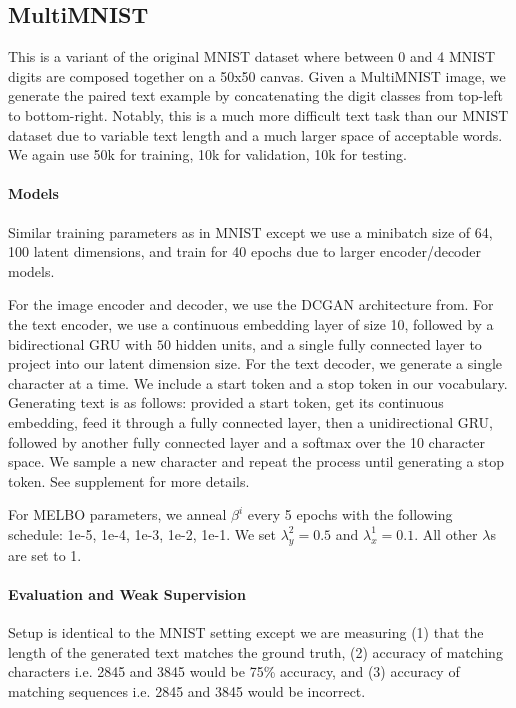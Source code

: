 \documentclass{article}
\begin{document}
\subsection{MultiMNIST}

This is a variant of the original MNIST dataset where between 0 and 4 MNIST digits are composed together on a 50x50 canvas. Given a MultiMNIST image, we generate the paired text example by concatenating the digit classes from top-left to bottom-right. Notably, this is a much more difficult text task than our MNIST dataset due to variable text length and a much larger space of acceptable words. We again use 50k for training, 10k for validation, 10k for testing.

\paragraph{Models} Similar training parameters as in MNIST except we use a minibatch size of 64, 100 latent dimensions, and train for 40 epochs due to larger encoder/decoder models.

For the image encoder and decoder, we use the DCGAN architecture from. For the text encoder, we use a continuous embedding layer of size 10, followed by a bidirectional GRU with $50$ hidden units, and a single fully connected layer to project into our latent dimension size. For the text decoder, we generate a single character at a time. We include a start token and a stop token in our vocabulary. Generating text is as follows: provided a start token, get its continuous embedding, feed it through a fully connected layer, then a unidirectional GRU, followed by another fully connected layer and a softmax over the 10 character space. We sample a new character and repeat the process until generating a stop token. See supplement for more details.

For MELBO parameters, we anneal $\beta^{i}$ every 5 epochs with the following schedule: 1e-5, 1e-4, 1e-3, 1e-2, 1e-1. We set $\lambda_{y}^{2} = 0.5$ and $\lambda_{x}^{1} = 0.1$. All other $\lambda$s are set to 1.

\paragraph{Evaluation and Weak Supervision} Setup is identical to the MNIST setting except we are measuring (1) that the length of the generated text matches the ground truth, (2) accuracy of matching characters i.e. 2845 and 3845 would be 75\% accuracy, and (3) accuracy of matching sequences i.e. 2845 and 3845 would be incorrect.
\end{document}
